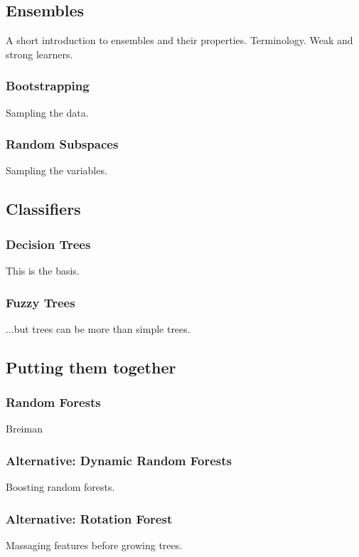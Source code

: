 \documentclass[a4paper,man,12pt,apacite]{apa6} %
\begin{document}
\subsection{Ensembles}
A short introduction to ensembles and their properties. Terminology.
Weak and strong learners.

\subsubsection{Bootstrapping}
Sampling the data.

\subsubsection{Random Subspaces}
Sampling the variables.

\subsection{Classifiers}

\subsubsection{Decision Trees}
This is the basis.

\subsubsection{Fuzzy Trees}
...but trees can be more than simple trees.

\subsection{Putting them together}

\subsubsection{Random Forests}
Breiman

\subsubsection{Alternative: Dynamic Random Forests}
Boosting random forests.

\subsubsection{Alternative: Rotation Forest}
Massaging features before growing trees.
\end{document}
